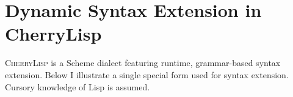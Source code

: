 \documentclass[a4paper]{llncs}
\def\cherrylisp{\textsc{CherryLisp}\xspace}
\begin{document}

\section{Dynamic Syntax Extension in CherryLisp}
\label{SECT:cherrylisp}


\cherrylisp is a Scheme dialect featuring runtime, grammar-based
syntax extension. Below I illustrate a single special form used for
syntax extension.  Cursory knowledge of Lisp is assumed.

\end{document}
